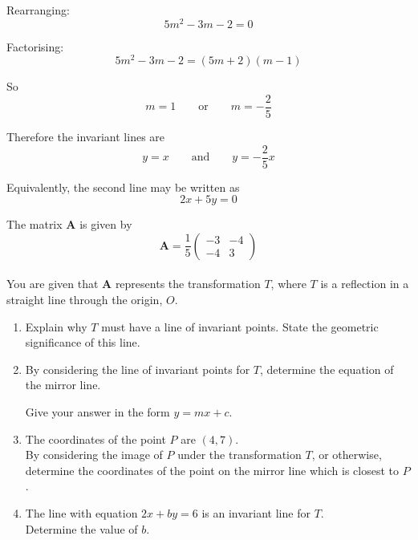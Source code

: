 \documentclass[leqno]{article}
\begin{document}
\begin{enumerate}[
  label=\textbf{\arabic*.},
  leftmargin=*,
  topsep=0pt,
  partopsep=0pt,
  parsep=0pt
]
\begin{djsSolution}
\begin{enumerate}[label=\textbf{(\alph*)}]
  Rearranging:
  \[
  5m^2-3m-2=0
  \]

  Factorising:
  \[
  5m^2-3m-2=(5m+2)(m-1)
  \]

  So
  \[
  m=1 \qquad \text{or} \qquad m=-\frac25
  \]

  Therefore the invariant lines are
  \[
  y=x
  \qquad\text{and}\qquad
  y=-\frac25x
  \]

  Equivalently, the second line may be written as
  \[
  2x+5y=0
  \]
\end{enumerate}
\end{djsSolution}


\newpage

\questionitem

The matrix $\mathbf{A}$ is given by
\[
\mathbf{A} = \frac{1}{5}\begin{pmatrix}-3 & -4 \\ -4 & 3\end{pmatrix}
\] \\
You are given that $\mathbf{A}$ represents the transformation $T$, where $T$ is a reflection in a straight line through the origin, $O$. \\
\begin{enumerate}[label=\textbf{(\alph*)}]
  \item Explain why $T$ must have a line of invariant points. State the geometric significance of this line.  \\
  \item By considering the line of invariant points for $T$, determine the equation of the mirror line.

Give your answer in the form $y = mx + c$.  \\
  \item The coordinates of the point $P$ are $(4, 7)$. \\
  By considering the image of $P$ under the transformation $T$, or otherwise, determine the coordinates of the point on the mirror line which is closest to $P$.  \\
  \item The line with equation $2x + by = 6$ is an invariant line for $T$. \\
  Determine the value of $b$.  \\
\end{enumerate}

\vspace*{10pt}


\end{enumerate}
\end{document}
